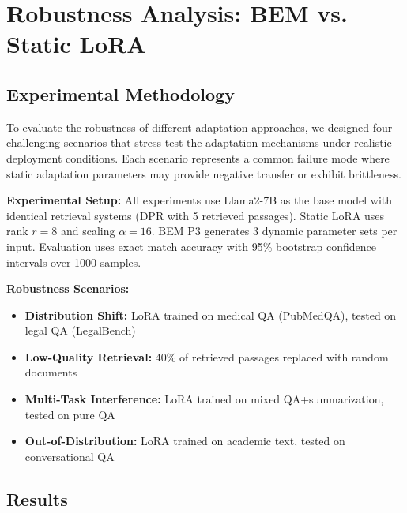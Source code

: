 \section{Robustness Analysis: BEM vs. Static LoRA}

\subsection{Experimental Methodology}

To evaluate the robustness of different adaptation approaches, we designed four challenging scenarios that stress-test the adaptation mechanisms under realistic deployment conditions. Each scenario represents a common failure mode where static adaptation parameters may provide negative transfer or exhibit brittleness.

\textbf{Experimental Setup:} All experiments use Llama2-7B as the base model with identical retrieval systems (DPR with 5 retrieved passages). Static LoRA uses rank $r=8$ and scaling $\alpha=16$. BEM P3 generates 3 dynamic parameter sets per input. Evaluation uses exact match accuracy with 95\% bootstrap confidence intervals over 1000 samples.

\textbf{Robustness Scenarios:}
\begin{itemize}
    \item \textbf{Distribution Shift:} LoRA trained on medical QA (PubMedQA), tested on legal QA (LegalBench)
    \item \textbf{Low-Quality Retrieval:} 40\% of retrieved passages replaced with random documents 
    \item \textbf{Multi-Task Interference:} LoRA trained on mixed QA+summarization, tested on pure QA
    \item \textbf{Out-of-Distribution:} LoRA trained on academic text, tested on conversational QA
\end{itemize}

\subsection{Results}


